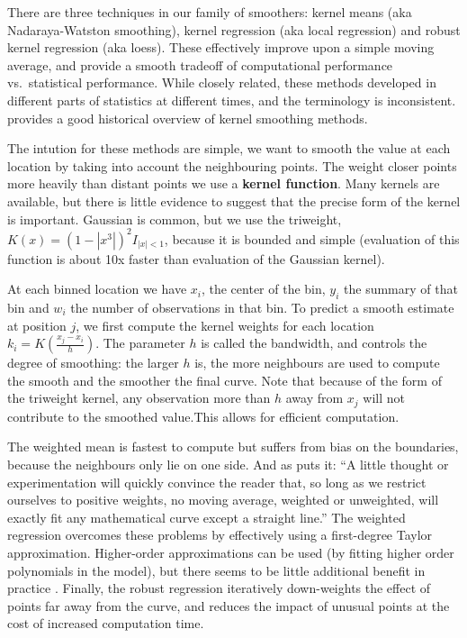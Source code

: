 \documentclass[journal]{vgtc}                %
\begin{document}
There are three techniques in our family of smoothers: kernel means (aka Nadaraya-Watston smoothing), kernel regression (aka local regression) and robust kernel regression (aka loess). These effectively improve upon a simple moving average, and provide a smooth tradeoff of computational performance vs.\ statistical performance. While closely related, these methods developed in different parts of statistics at different times, and the terminology is inconsistent. \citep{cleveland:1996} provides a good historical overview of kernel smoothing methods.

The intution for these methods are simple, we want to smooth the value at each location by taking into account the neighbouring points. The weight closer points more heavily than distant points we use a {\bf kernel function}. Many kernels are available, but there is little evidence to suggest that the precise form of the kernel is important. Gaussian is common, but we use the triweight, $K(x) = (1 - |x^3|)^2 I_{|x| < 1}$, because it is bounded and simple (evaluation of this function is about 10x faster than evaluation of the Gaussian kernel).  

At each binned location we have $x_i$, the center of the bin, $y_i$ the summary of that bin and $w_i$ the number of observations in that bin. To predict a smooth estimate at position $j$, we first compute the kernel weights for each location $k_i = K(\frac{x_j - x_i}{h})$. The parameter $h$ is called the bandwidth, and controls the degree of smoothing: the larger $h$ is, the more neighbours are used to compute the smooth and the smoother the final curve. Note that because of the form of the triweight kernel, any observation more than $h$ away from $x_j$ will not contribute to the smoothed value.This allows for efficient computation.

The weighted mean is fastest to compute but suffers from bias on the boundaries, because the neighbours only lie on one side. And as \citep{macaulay:1931} puts it: ``A little thought or experimentation will quickly convince the reader that, so long as we restrict ourselves to positive weights, no moving average, weighted or unweighted, will exactly fit any mathematical curve except a straight line.'' The weighted regression overcomes these problems by effectively using a first-degree Taylor approximation. Higher-order approximations can be used (by fitting higher order polynomials in the model), but there seems to be little additional benefit in practice \citep{cleveland:1996}.  Finally, the robust regression iteratively down-weights the effect of points far away from the curve, and reduces the impact of unusual points at the cost of increased computation time.
\end{document}
